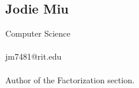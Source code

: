 \documentclass{article}
\begin{document}
\subsection*{Jodie Miu}
   Computer Science
   \\
   \\ jm7481@rit.edu 
   \\
   \\ Author of the Factorization section.
   
   



 

\end{document}
